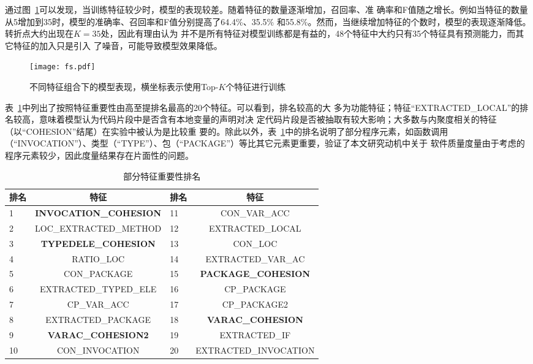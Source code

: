 通过图~\ref{features}可以发现，当训练特征较少时，模型的表现较差。随着特征的数量逐渐增加，召回率、准
确率和F值随之增长。例如当特征的数量从5增加到35时，模型的准确率、召回率和F值分别提高了64.4\%、35.5\%
和55.8\%。然而，当继续增加特征的个数时，模型的表现逐渐降低。转折点大约出现在$K=35$处，因此有理由认为
并不是所有特征对模型训练都是有益的，48个特征中大约只有35个特征具有预测能力，而其它特征的加入只是引入
了噪音，可能导致模型效果降低。

  \begin{figure}
  \centering
  \texttt{[image: fs.pdf]}
    \caption{不同特征组合下的模型表现，横坐标表示使用Top-$K$个特征进行训练}
    \label{features}
  \end{figure}

表~\ref{important_features}中列出了按照特征重要性由高至提排名最高的20个特征。可以看到，排名较高的大
多为功能特征；特征``EXTRACTED\_LOCAL''的排名较高，意味着模型认为代码片段中是否含有本地变量的声明对决
定代码片段是否被抽取有较大影响；大多数与内聚度相关的特征（以``COHESION''结尾）在实验中被认为是比较重
要的。除此以外，表~\ref{important_features}中的排名说明了部分程序元素，如函数调用
（``INVOCATION''）、类型（``TYPE''）、包（``PACKAGE''）等比其它元素更重要，验证了本文研究动机中关于
软件质量度量由于考虑的程序元素较少，因此度量结果存在片面性的问题。

\begin{table}[!t]
\zihaowu
  \renewcommand{\arraystretch}{1.3}
  \caption{部分特征重要性排名}
  \label{important_features}
  \centering
  \begin{tabular}{p{1cm}c|p{1cm}c}
  \toprule 排名 &特征 &排名 &特征 \\ \midrule
  1& \textbf{INVOCATION\_COHESION}& 11& CON\_VAR\_ACC\\
  2& LOC\_EXTRACTED\_METHOD& 12& EXTRACTED\_LOCAL\\
  3& \textbf{TYPEDELE\_COHESION}& 13& CON\_LOC\\
  4& RATIO\_LOC& 14& EXTRACTED\_VAR\_AC\\
  5& CON\_PACKAGE& 15& \textbf{PACKAGE\_COHESION}\\
  6& EXTRACTED\_TYPED\_ELE& 16& CP\_PACKAGE\\
  7& CP\_VAR\_ACC& 17& CP\_PACKAGE2\\
  8& EXTRACTED\_PACKAGE& 18& \textbf{VARAC\_COHESION}\\
  9& \textbf{VARAC\_COHESION2}& 19& EXTRACTED\_IF\\
  10& CON\_INVOCATION& 20& EXTRACTED\_INVOCATION\\
  \bottomrule 
  \end{tabular}
  \end{table}
  
